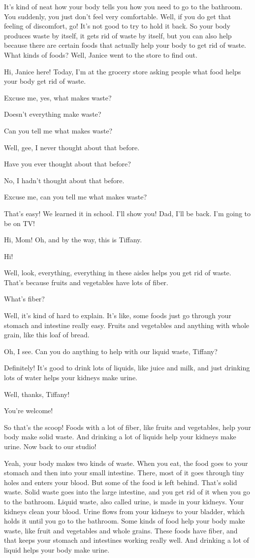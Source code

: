 It's kind of neat how your body tells you how you need to go to the bathroom. You suddenly, you just don't feel very comfortable. Well, if you do get that feeling of discomfort, go! It's not good to try to hold it back. So your body produces waste by itself, it gets rid of waste by itself, but you can also help because there are certain foods that actually help your body to get rid of waste. What kinds of foods? Well, Janice went to the store to find out.

Hi, Janice here! Today, I'm at the grocery store asking people what food helps your body get rid of waste.

Excuse me, yes, what makes waste?

Doesn't everything make waste?

Can you tell me what makes waste?

Well, gee, I never thought about that before.

Have you ever thought about that before?

No, I hadn't thought about that before.

Excuse me, can you tell me what makes waste?

That's easy! We learned it in school. I'll show you! Dad, I'll be back. I'm going to be on TV!

Hi, Mom! Oh, and by the way, this is Tiffany.

Hi!

Well, look, everything, everything in these aisles helps you get rid of waste. That's because fruits and vegetables have lots of fiber.

What's fiber?

Well, it's kind of hard to explain. It's like, some foods just go through your stomach and intestine really easy. Fruits and vegetables and anything with whole grain, like this loaf of bread.

Oh, I see. Can you do anything to help with our liquid waste, Tiffany?

Definitely! It's good to drink lots of liquids, like juice and milk, and just drinking lots of water helps your kidneys make urine.

Well, thanks, Tiffany!

You're welcome!

So that's the scoop! Foods with a lot of fiber, like fruits and vegetables, help your body make solid waste. And drinking a lot of liquids help your kidneys make urine. Now back to our studio!

Yeah, your body makes two kinds of waste. When you eat, the food goes to your stomach and then into your small intestine. There, most of it goes through tiny holes and enters your blood. But some of the food is left behind. That's solid waste. Solid waste goes into the large intestine, and you get rid of it when you go to the bathroom. Liquid waste, also called urine, is made in your kidneys. Your kidneys clean your blood. Urine flows from your kidneys to your bladder, which holds it until you go to the bathroom. Some kinds of food help your body make waste, like fruit and vegetables and whole grains. These foods have fiber, and that keeps your stomach and intestines working really well. And drinking a lot of liquid helps your body make urine.

